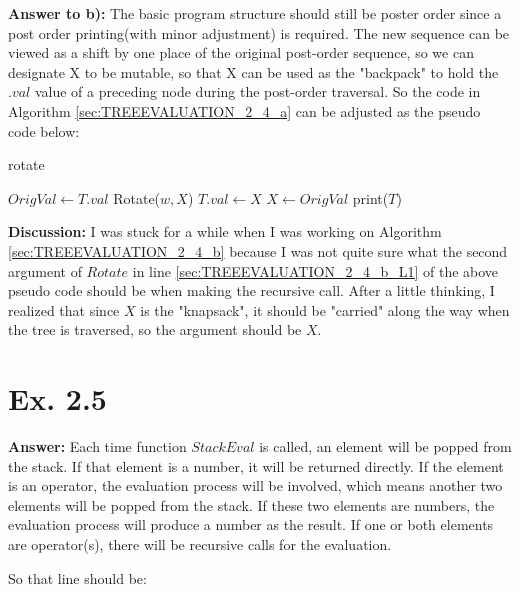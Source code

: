 \documentclass[a4paper,11pt]{article}
\theoremstyle{mytheor}
\begin{document}
\vspace{1.2in}

\noindent\textbf{Answer to b):} The basic program structure should still be poster order since a post order printing(with minor adjustment) is required. The new sequence can be viewed as a shift by one place of the original post-order sequence, so we can designate X to be mutable, so that X can be used as the "backpack" to hold the $.val$ value of a preceding node during the post-order traversal. So the code in Algorithm \ref{sec:TREEEVALUATION_2_4_a} can be adjusted as the pseudo code below:
\begin{algorithm}[H]
\caption{rotate}\label{sec:TREEEVALUATION_2_4_b}
\begin{algorithmic}[1]
  \State $OrigVal \gets T.val$
    \State Rotate($w, X$) \label{sec:TREEEVALUATION_2_4_b_L1}
  \EndFor
  \State $T.val \gets X$ 
  \State $X \gets OrigVal$ 
  \State print($T$)
\EndProcedure
\end{algorithmic}
\end{algorithm}
\noindent\textbf{Discussion:} I was stuck for a while when I was working on Algorithm \ref{sec:TREEEVALUATION_2_4_b} because I was not quite sure what the second argument of $Rotate$ in line \ref{sec:TREEEVALUATION_2_4_b_L1} of the above pseudo code should be when making the recursive call. After a little thinking, I realized that since $X$ is the "knapsack", it should be "carried" along the way when the tree is traversed, so the argument should be $X$.

\vspace{1.2in}

\section*{Ex. 2.5}
\noindent\textbf{Answer:} Each time function $StackEval$ is called, an element will be popped from the stack. If that element is a number, it will be returned directly. If the element is an operator, the evaluation process will be involved, which means another two elements will be popped from the stack. If these two elements are numbers, the evaluation process will produce a number as the result. If one or both elements are operator(s), there will be recursive calls for the evaluation.

So that line should be:
\end{document}
